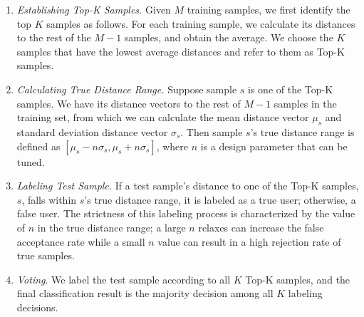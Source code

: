 \begin{enumerate}

\item \emph{Establishing Top-K Samples.} Given $M$ training samples, we first identify the top $K$
samples as follows. For each training sample, we calculate its distances to the rest of the $M-1$ samples, and obtain the average. We choose the $K$ samples that have the lowest average distances and refer to them as Top-K samples.

\item \emph{Calculating True Distance Range.} Suppose sample $s$ is one of the Top-K samples. We have its distance vectors to the rest of $M-1$ samples in the training set, from which we can calculate the mean distance vector $\mu_s$ and standard deviation distance vector $\sigma_s$. Then sample $s$'s true distance range is defined as $[\mu_s-n\sigma_s, \mu_s+n\sigma_s]$, where $n$ is a design parameter that can be tuned. 
    
\item \emph{Labeling Test Sample.}   If a test sample's distance to  one of the Top-K samples, $s$, falls within $s$'s true distance range, it is labeled as a true user; otherwise, a false user. The strictness of this labeling process is characterized by
the value of $n$ in the true distance range; a large $n$ relaxes can increase the false
acceptance rate while a small $n$ value can result in a
high rejection rate of true samples. %

\item \emph{Voting}. We label the test sample according to all $K$ Top-K samples, and the final classification result is the majority decision among all $K$ labeling decisions. 



\end{enumerate}
